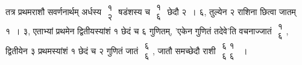 \documentclass[10pt, openany]{book}
\begin{document}
\vspace{-2mm}
{तत्र प्रथमराशौ सवर्णनार्थम् अर्धस्य $\begin{matrix}

\mbox{{१}}\\

\mbox{{२}}

\end{matrix}$ षडंशस्य च $\begin{matrix}

\mbox{{१}}\\

\mbox{{६}}

\end{matrix}$ छेदौ २~। ६, तुल्येन २ राशिना}
{छित्वा जातम् १~। ३, एताभ्यां प्रथमेन द्वितीयस्यांशं १ छेदं च ६ गुणितम्,
{\qt 'एकेन गुणितं तदेवे'}ति वचनाज्जातं $\begin{matrix}

\mbox{{१}}\\

\mbox{{६}}

\end{matrix}$, द्वितीयेन ३ प्रथमस्यांशं १ छेदं च २ गुणितं जातं $\begin{matrix}

\mbox{{६}}\\

\mbox{{६}}

\end{matrix}$, जातौ समच्छेदौ राशी $\begin{matrix}

\mbox{{६ १}}\\

\mbox{{६ ६}}

\end{matrix}$~। }

\newpage
\end{document}
